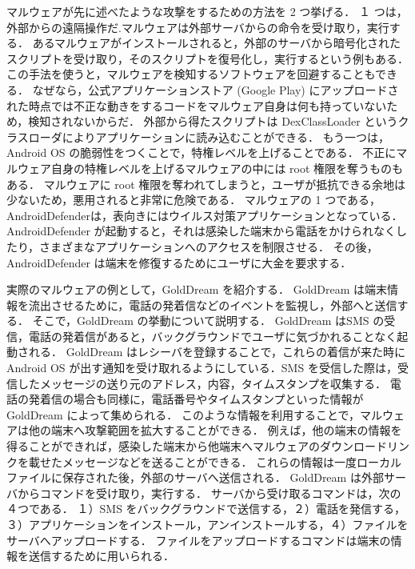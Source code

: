 マルウェアが先に述べたような攻撃をするための方法を 2 つ挙げる．
１ つは，外部からの遠隔操作だ\cite{remotectrl}.マルウェアは外部サーバからの命令を受け取り，実行する．
あるマルウェアがインストールされると，外部のサーバから暗号化されたスクリプトを受け取り，そのスクリプトを復号化し，実行するという例もある．
この手法を使うと，マルウェアを検知するソフトウェアを回避することもできる．
なぜなら，公式アプリケーションストア (Google Play)  にアップロードされた時点では不正な動きをするコードをマルウェア自身は何も持っていないため，検知されないからだ．
外部から得たスクリプトは DexClassLoader というクラスローダによりアプリケーションに読み込むことができる．
もう一つは，Android OS の脆弱性をつくことで，特権レベルを上げることである．
不正にマルウェア自身の特権レベルを上げるマルウェアの中には root 権限を奪うものもある．
マルウェアに root 権限を奪われてしまうと，ユーザが抵抗できる余地は少ないため，悪用されると非常に危険である．
マルウェアの 1 つである，AndroidDefender\cite{sopho}は，表向きにはウイルス対策アプリケーションとなっている．
AndroidDefender が起動すると，それは感染した端末から電話をかけられなくしたり，さまざまなアプリケーションへのアクセスを制限させる．
その後，AndroidDefender は端末を修復するためにユーザに大金を要求する．
 
実際のマルウェアの例として，GoldDream を紹介する．
GoldDream は端末情報を流出させるために，電話の発着信などのイベントを監視し，外部へと送信する．
そこで，GoldDream の挙動について説明する．
GoldDream はSMS の受信，電話の発着信があると，バックグラウンドでユーザに気づかれることなく起動される．
GoldDream はレシーバを登録することで，これらの着信が来た時に Android OS が出す通知を受け取れるようにしている．SMS を受信した際は，受信したメッセージの送り元のアドレス，内容，タイムスタンプを収集する．
電話の発着信の場合も同様に，電話番号やタイムスタンプといった情報が GoldDream によって集められる．
このような情報を利用することで，マルウェアは他の端末へ攻撃範囲を拡大することができる．
例えば，他の端末の情報を得ることができれば，感染した端末から他端末へマルウェアのダウンロードリンクを載せたメッセージなどを送ることができる．
これらの情報は一度ローカルファイルに保存された後，外部のサーバへ送信される．
GoldDream は外部サーバからコマンドを受け取り，実行する．
サーバから受け取るコマンドは，次の ４つである．
１）SMS をバックグラウンドで送信する，２）電話を発信する，３）アプリケーションをインストール，アンインストールする，４）ファイルをサーバへアップロードする． 
ファイルをアップロードするコマンドは端末の情報を送信するために用いられる．



